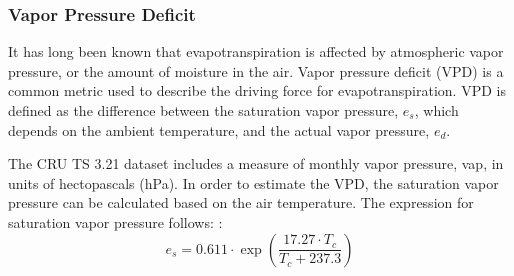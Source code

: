 \subsubsection{Vapor Pressure Deficit}
\label{sec:gepvpd}
It has long been known that evapotranspiration is affected by atmospheric vapor pressure, or the amount of moisture in the air. 
Vapor pressure deficit (VPD) is a common metric used to describe the driving force for evapotranspiration.  
VPD is defined as the difference between the saturation vapor pressure, $e_s$, which depends on the ambient temperature, and the actual vapor pressure, $e_d$. 

The CRU TS 3.21 dataset includes a measure of monthly vapor pressure, vap, in units of hectopascals (hPa).  
In order to estimate the VPD, the saturation vapor pressure can be calculated based on the air temperature.  
The expression for saturation vapor pressure follows: \parencite[Eq. 5.1]{abtew13}:
%
\begin{equation}
\label{eq:es}
    e_s = 0.611 \cdot \exp \left( \frac{17.27 \cdot T_c}{T_c + 237.3} \right)
\end{equation}

